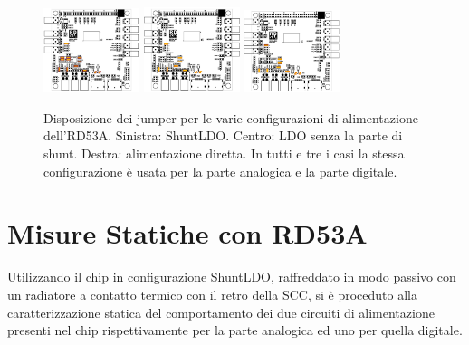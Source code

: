 \begin{figure}[h]
\centering
\includegraphics[width=0.25\textwidth]{Immagini/SLDOmode}
\hfill
\includegraphics[width=0.25\textwidth]{Immagini/LDOmodeDefault}
\hfill
\includegraphics[width=0.25\textwidth]{Immagini/DirectPowering}
\caption{Disposizione dei jumper per le varie configurazioni di alimentazione dell'RD53A. Sinistra: ShuntLDO. Centro: LDO senza la parte di shunt. Destra: alimentazione diretta. In tutti e tre i casi la stessa configurazione \`e usata per la parte analogica e la parte digitale.}
\label{SLDOmodes}
\end{figure}

\section{Misure Statiche con RD53A}
\label{MisureStaticheRD53A}
Utilizzando il chip in configurazione ShuntLDO, raffreddato in modo passivo con un radiatore a contatto termico con il retro della SCC, si è proceduto alla caratterizzazione statica del comportamento dei due circuiti di alimentazione presenti nel chip rispettivamente per la parte analogica ed uno per quella digitale.

